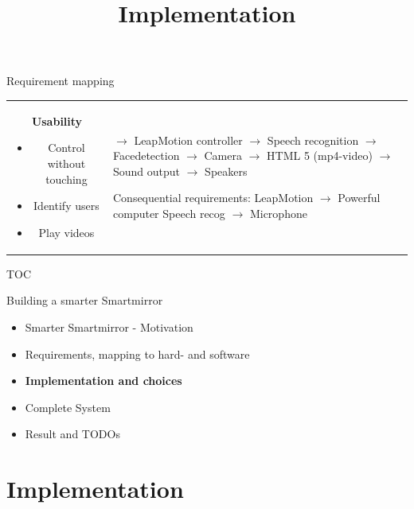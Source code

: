 \documentclass[xcolor=svgnames,handout,aspectratio=169]{beamer}
\begin{document}
\begin{frame}
	{Requirement mapping}
	\begin{tabular}{cl}  
			\parbox{0.6\linewidth}{
				\textbf{Usability}
				\begin{itemize}
					\item Control without touching
					\item Identify users
					\item Play videos
				\end{itemize}
			}
		&
			\parbox{0.4\linewidth}{
				$\rightarrow$ LeapMotion controller\\
				$\rightarrow$ Speech recognition\\
				$\rightarrow$ Facedetection $\rightarrow$ Camera\\
				$\rightarrow$ HTML 5 (mp4-video)\\
				$\rightarrow$ Sound output $\rightarrow$ Speakers\\
				
				Consequential requirements:\\
				LeapMotion $\rightarrow$ Powerful computer\\
				Speech recog $\rightarrow$ Microphone
			}
	\end{tabular}	
\end{frame}

\begin{frame}
  {TOC}

  Building a smarter Smartmirror

  \begin{itemize}
  \item Smarter Smartmirror - Motivation
  \item Requirements, mapping to hard- and software
  \item \textbf{Implementation and choices}
  \item Complete System
  \item Result and TODOs
  \end{itemize}
\end{frame}

\section{Implementation}
\title[Implementation]{Implementation}
\end{document}
